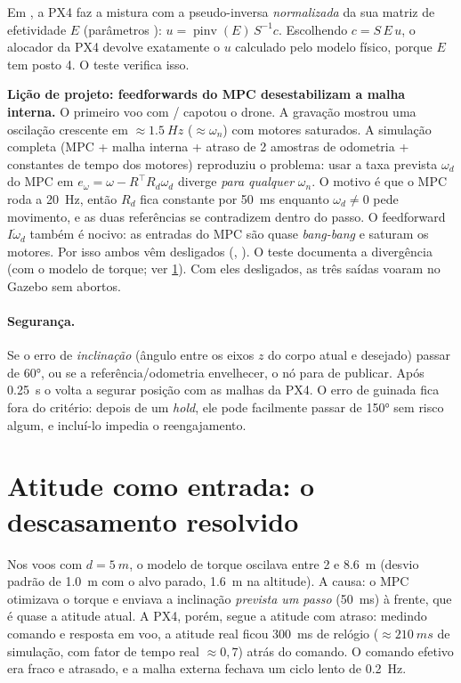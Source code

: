 Em , a PX4 faz a mistura com a pseudo-inversa \emph{normalizada}
da sua matriz de efetividade $E$ (parâmetros ):
$u=\operatorname{pinv}(E)\,S^{-1}c$. Escolhendo $c=S\,E\,u$, o alocador da PX4 devolve
exatamente o $u$ calculado pelo modelo físico, porque $E$ tem posto 4. O teste
 verifica isso.

\begin{atencao}
\textbf{Lição de projeto: feedforwards do MPC desestabilizam a malha interna.}
O primeiro voo com / capotou o drone. A gravação mostrou
uma oscilação crescente em $\approx\SI{1,5}{Hz}$ ($\approx\omega_n$) com motores saturados.
A simulação completa (MPC + malha interna + atraso de 2 amostras de odometria + constantes
de tempo dos motores) reproduziu o problema: usar a taxa prevista $\omega_d$ do MPC em
$e_\omega=\omega-R^\top R_d\omega_d$ diverge \emph{para qualquer} $\omega_n$. O motivo é que o
MPC roda a \SI{20}{Hz}, então $R_d$ fica constante por \SI{50}{ms} enquanto $\omega_d\neq0$
pede movimento, e as duas referências se contradizem dentro do passo. O feedforward
$I\dot\omega_d$ também é nocivo: as entradas do MPC são quase \emph{bang-bang} e saturam os
motores. Por isso ambos vêm desligados (, ).
O teste  documenta a divergência (com o modelo de torque; ver \cref{sec:mpc-dinamico-atitude}).
Com eles desligados, as três saídas voaram no Gazebo sem abortos.
\end{atencao}

\paragraph{Segurança.} Se o erro de \emph{inclinação} (ângulo entre os eixos $z$ do corpo
atual e desejado) passar de \ang{60}, ou se a referência/odometria envelhecer, o nó para de
publicar. Após \SI{0,25}{s} o  volta a segurar posição com as malhas
da PX4. O erro de guinada fica fora do critério: depois de um \emph{hold}, ele pode
facilmente passar de \ang{150} sem risco algum, e incluí-lo impedia o reengajamento.

\section{Atitude como entrada: o descasamento resolvido}
\label{sec:mpc-dinamico-atitude}
Nos voos com $d=\SI{5}{m}$, o modelo de torque oscilava entre 2 e \SI{8,6}{m} (desvio
padrão de \SI{1,0}{m} com o alvo parado, \SI{1,6}{m} na altitude). A causa: o MPC
otimizava o torque e enviava a inclinação \emph{prevista um passo} (\SI{50}{ms}) à frente,
que é quase a atitude atual. A PX4, porém, segue a atitude com atraso: medindo comando e
resposta em voo, a atitude real ficou \SI{300}{ms} de relógio ($\approx\SI{210}{ms}$ de
simulação, com fator de tempo real $\approx0{,}7$) atrás do comando. O comando efetivo era
fraco e atrasado, e a malha externa fechava um ciclo lento de \SI{0,2}{Hz}.

